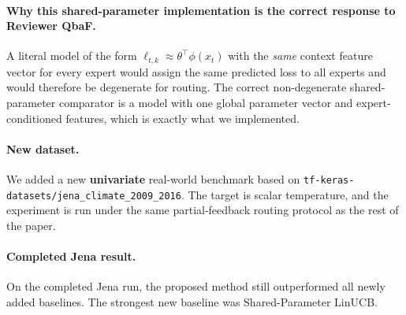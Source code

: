 \documentclass[11pt]{article}
\begin{document}
\paragraph{Why this shared-parameter implementation is the correct response to Reviewer QbaF.}
A literal model of the form $\ell_{t,k} \approx \theta^\top \phi(x_t)$ with the \emph{same} context feature vector for every expert would assign the same predicted loss to all experts and would therefore be degenerate for routing. The correct non-degenerate shared-parameter comparator is a model with one global parameter vector and expert-conditioned features, which is exactly what we implemented.

\paragraph{New dataset.}
We added a new \textbf{univariate} real-world benchmark based on \texttt{tf-keras-datasets/jena\_climate\_2009\_2016}. The target is scalar temperature, and the experiment is run under the same partial-feedback routing protocol as the rest of the paper.

\paragraph{Completed Jena result.}
On the completed Jena run, the proposed method still outperformed all newly added baselines. The strongest new baseline was Shared-Parameter LinUCB.
\end{document}
